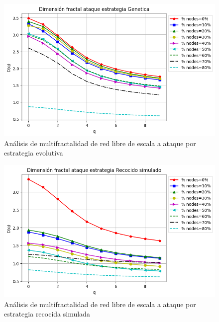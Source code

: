 \begin{figure}[H]
    \centering
    \includegraphics[scale=0.7]{Capitulo6MultifractalidadYRobustez/imagenes/grafica_DqGenetic20180512_143117ScaleFree8000Nodes.png}
    \caption{Análisis de multifractalidad de red libre de escala a ataque por estrategia evolutiva }
\end{figure}

\begin{figure}[H]
    \centering
    \includegraphics[scale=0.7]{Capitulo6MultifractalidadYRobustez/imagenes/grafica_DqSimulated20180512_143117ScaleFree8000Nodes.png}
    \caption{Análisis de multifractalidad de red libre de escala a ataque por estrategia recocida simulada }
\end{figure}


